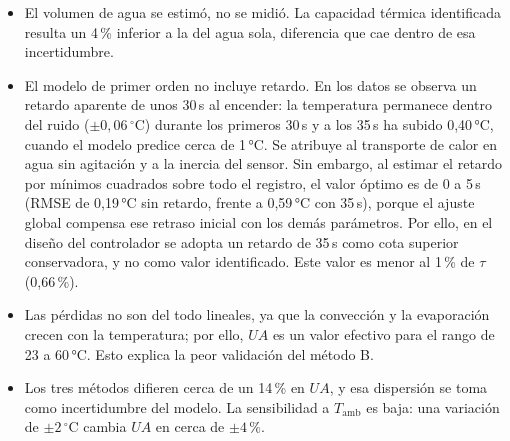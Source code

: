 \begin{itemize}
\item El volumen de agua se estimó, no se midió. La capacidad térmica identificada resulta un 4\,\% inferior a la del agua sola, diferencia que cae dentro de esa incertidumbre.
\item El modelo de primer orden no incluye retardo. En los datos se observa un retardo aparente de unos 30\,s al encender: la temperatura permanece dentro del ruido ($\pm 0{,}06\,^{\circ}\mathrm{C}$) durante los primeros 30\,s y a los 35\,s ha subido 0,40\,°C, cuando el modelo predice cerca de 1\,°C. Se atribuye al transporte de calor en agua sin agitación y a la inercia del sensor. Sin embargo, al estimar el retardo por mínimos cuadrados sobre todo el registro, el valor óptimo es de 0 a 5\,s (RMSE de 0,19\,°C sin retardo, frente a 0,59\,°C con 35\,s), porque el ajuste global compensa ese retraso inicial con los demás parámetros. Por ello, en el diseño del controlador se adopta un retardo de 35\,s como cota superior conservadora, y no como valor identificado. Este valor es menor al 1\,\% de $\tau$ (0,66\,\%).
\item Las pérdidas no son del todo lineales, ya que la convección y la evaporación crecen con la temperatura; por ello, $UA$ es un valor efectivo para el rango de 23 a 60\,°C. Esto explica la peor validación del método B.
\item Los tres métodos difieren cerca de un 14\,\% en $UA$, y esa dispersión se toma como incertidumbre del modelo. La sensibilidad a $T_{\mathrm{amb}}$ es baja: una variación de $\pm 2\,^{\circ}\mathrm{C}$ cambia $UA$ en cerca de $\pm 4\,\%$.
\end{itemize}
